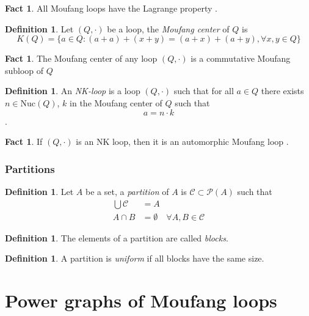 \documentclass[12pt, twoside, openright]{report}
\theoremstyle{definition}
\newtheorem{fct}[thm]{Fact}
\newtheorem{dfn}[thm]{Definition}
\newcommand{\nuc}{\text{Nuc}}       %
\begin{document}
\begin{fct}
  All Moufang loops have the Lagrange property \cite{LG}. 
\end{fct}

\begin{dfn}
  Let $(Q,\cdot)$ be a loop, the \emph{Moufang center} of $Q$ is
  \[K(Q) = \{a\in Q : (a + a) + (x + y) = (a + x) + (a + y),\forall x, y\in Q\}\]\cite{KepkaKinyonPhillips}
\end{dfn}

\begin{fct}
  The Moufang center of any loop $(Q, \cdot)$ is a commutative Moufang subloop of $Q$ \cite{Bruck}
\end{fct}

\begin{dfn}
  An \emph{NK-loop} is a loop $(Q, \cdot)$ such that for all $a\in Q$ there exists $n\in \nuc(Q)$, $k$
    in the Moufang center of $Q$ such that
  \[a = n \cdot k\]
  \cite{KepkaKinyonPhillips}.
\end{dfn}

\begin{fct}
  If $(Q,\cdot)$ is an NK loop, then it is an automorphic Moufang loop \cite{KepkaKinyonPhillips}.
\end{fct}

\subsection{Partitions}

\begin{dfn}
  Let $A$ be a set, a \emph{partition} of $A$ is $\mathcal{C}\subset\mathcal{P}(A)$ such that
  \begin{align*}
    \bigcup \mathcal{C} &= A\\
    A\cap B &= \emptyset\quad \forall A, B\in\mathcal{C}
  \end{align*}
\end{dfn}

\begin{dfn}
  The elements of a partition are called \emph{blocks}.
\end{dfn}

\begin{dfn}
  A partition is \emph{uniform} if all blocks have the same size.
\end{dfn}


\chapter{Power graphs of Moufang loops}
\end{document}

